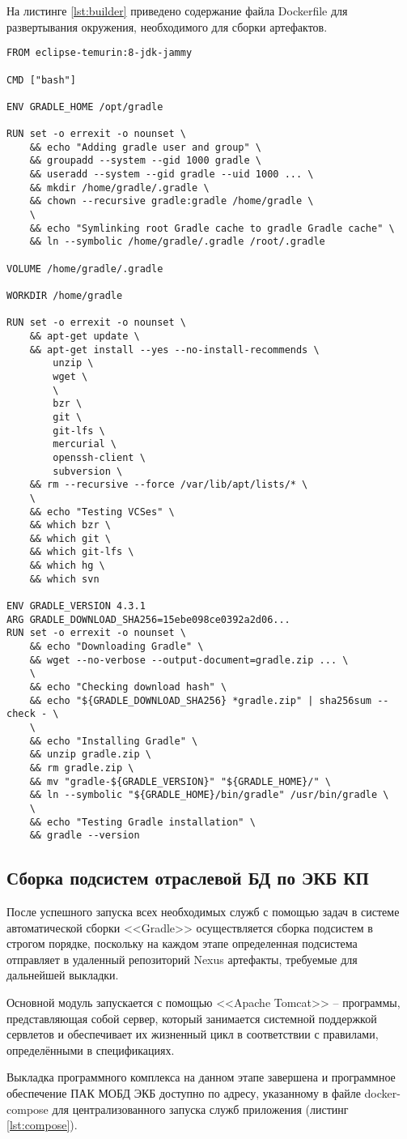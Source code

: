 На листинге \ref{lst:builder} приведено содержание файла Dockerfile для развертывания окружения, необходимого для сборки артефактов.
\begin{lstlisting}[label=lst:builder,caption=Dockerfile для для службы builder]
FROM eclipse-temurin:8-jdk-jammy
	
CMD ["bash"]
	
ENV GRADLE_HOME /opt/gradle
	
RUN set -o errexit -o nounset \
	&& echo "Adding gradle user and group" \
	&& groupadd --system --gid 1000 gradle \
	&& useradd --system --gid gradle --uid 1000 ... \
	&& mkdir /home/gradle/.gradle \
	&& chown --recursive gradle:gradle /home/gradle \
	\
	&& echo "Symlinking root Gradle cache to gradle Gradle cache" \
	&& ln --symbolic /home/gradle/.gradle /root/.gradle
	
VOLUME /home/gradle/.gradle
	
WORKDIR /home/gradle
	
RUN set -o errexit -o nounset \
	&& apt-get update \
	&& apt-get install --yes --no-install-recommends \
		unzip \
		wget \
		\
		bzr \
		git \
		git-lfs \
		mercurial \
		openssh-client \
		subversion \
	&& rm --recursive --force /var/lib/apt/lists/* \
	\
	&& echo "Testing VCSes" \
	&& which bzr \
	&& which git \
	&& which git-lfs \
	&& which hg \
	&& which svn
	
ENV GRADLE_VERSION 4.3.1
ARG GRADLE_DOWNLOAD_SHA256=15ebe098ce0392a2d06...
RUN set -o errexit -o nounset \
	&& echo "Downloading Gradle" \
	&& wget --no-verbose --output-document=gradle.zip ... \
	\
	&& echo "Checking download hash" \
	&& echo "${GRADLE_DOWNLOAD_SHA256} *gradle.zip" | sha256sum --check - \
	\
	&& echo "Installing Gradle" \
	&& unzip gradle.zip \
	&& rm gradle.zip \
	&& mv "gradle-${GRADLE_VERSION}" "${GRADLE_HOME}/" \
	&& ln --symbolic "${GRADLE_HOME}/bin/gradle" /usr/bin/gradle \
	\
	&& echo "Testing Gradle installation" \
	&& gradle --version
\end{lstlisting}

\subsection{Сборка подсистем отраслевой БД по ЭКБ КП}
После успешного запуска всех необходимых служб с помощью задач в системе автоматической сборки <<Gradle>> осуществляется сборка подсистем в строгом порядке, поскольку на каждом этапе определенная подсистема отправляет в удаленный репозиторий Nexus артефакты, требуемые для дальнейшей выкладки. 

Основной модуль запускается с помощью <<Apache Tomcat>> -- программы, представляющая собой сервер, который занимается системной поддержкой сервлетов и обеспечивает их жизненный цикл в соответствии с правилами, определёнными в спецификациях. \cite{tomcat} 

Выкладка программного комплекса на данном этапе завершена и программное обеспечение ПАК МОБД ЭКБ доступно по адресу, указанному в файле docker-compose для централизованного запуска служб приложения (листинг \ref{lst:compose}).